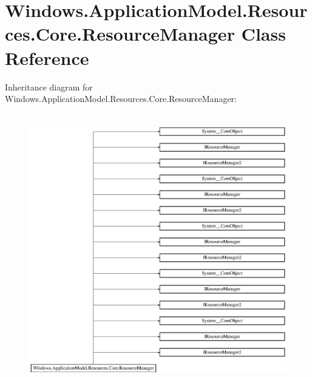 \hypertarget{class_windows_1_1_application_model_1_1_resources_1_1_core_1_1_resource_manager}{}\section{Windows.\+Application\+Model.\+Resources.\+Core.\+Resource\+Manager Class Reference}
\label{class_windows_1_1_application_model_1_1_resources_1_1_core_1_1_resource_manager}
Inheritance diagram for Windows.\+Application\+Model.\+Resources.\+Core.\+Resource\+Manager\+:\begin{figure}[H]
\begin{center}
\leavevmode
\includegraphics[height=11.883289cm]{class_windows_1_1_application_model_1_1_resources_1_1_core_1_1_resource_manager}
\end{center}
\end{figure}
